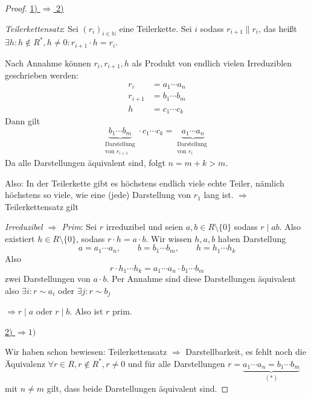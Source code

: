 \documentclass[a4paper,12pt,numbers=noenddot,parskip=full]{scrartcl}
\newcommand{\setN}{\mathbb{N}}
\newcommand{\heading}{\underline}
\theoremstyle{dotless}
\theoremstyle{remark}
\begin{document}
	\begin{proof}
		\heading{1) $\Rightarrow$ 2)}
		
		\textit{Teilerkettensatz}: Sei $(r_i)_{i \in \setN}$ eine Teilerkette. Sei $i$ sodass $r_{i+1} \parallel r_i$, das heißt $\exists h: h \notin R^*, h \neq 0: r_{i+1} \cdot h = r_i$.
		
		Nach Annahme können $r_i, r_{i+1},h$ als Produkt von endlich vielen Irreduziblen geschrieben werden:
		\begin{align*}
			r_i &= a_1 \cdots a_n \\
			r_{i+1} &= b_1 \cdots b_m \\
			h &= c_1 \cdots c_k
		\end{align*}
		Dann gilt
		\begin{equation*}
			\underbrace{b_1 \cdots b_m}_{\substack{\text{Darstellung} \\ \text{von $r_{i+1}$}}} \cdot c_1 \cdots c_k = \underbrace{a_1 \cdots a_n}_{\substack{\text{Darstellung }\\ \text{von $r_i$}}}
		\end{equation*}
		Da alle Darstellungen äquivalent sind, folgt $n = m + k > m$.
		
		Also: In der Teilerkette gibt es höchstens endlich viele echte Teiler, nämlich höchstens so viele, wie eine (jede) Darstellung von $r_1$ lang ist. $\Rightarrow$ Teilerkettensatz gilt
		
		\textit{Irreduzibel $\Rightarrow$ Prim}: Sei $r$ irreduzibel und seien $a,b \in R \setminus \{ 0 \}$ sodass $r \mid ab$. Also existiert $h \in R \setminus \{ 0 \}$, sodass $r \cdot h = a \cdot b$. Wir wissen $h,a,b$ haben Darstellung
		\begin{equation*}
			a = a_1 \cdots a_n, \qquad b = b_1 \cdots b_m, \qquad h = h_1 \cdots h_k
		\end{equation*}
		Also
		\begin{equation*}
			r \cdot h_1 \cdots h_k = a_1 \cdots a_n \cdot b_1 \cdots b_m
		\end{equation*}
		zwei Darstellungen von $a \cdot b$. Per Annahme sind diese Darstellungen äquivalent also $\exists i: r \sim a_i$ oder $\exists j: r \sim b_j$
		
		$\Rightarrow r \mid a$ oder $r \mid b$. Also ist $r$ prim.
		
		\heading{2) $\Rightarrow 1)$}
		
		Wir haben schon bewiesen: Teilerkettensatz $\Rightarrow$ Darstellbarkeit, es fehlt noch die Äquivalenz $\forall r \in R, r \notin R^*, r \neq 0$ und für alle Darstellungen $r =  \underbrace{a_1 \cdots a_n = b_1 \cdots b_m}_{(*)}$ mit $n \neq m$ gilt, dass beide Darstellungen äquivalent sind.
		

\end{proof}
\end{document}

